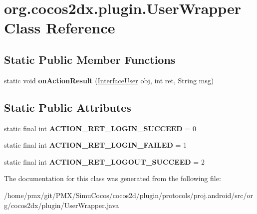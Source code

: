 \hypertarget{classorg_1_1cocos2dx_1_1plugin_1_1UserWrapper}{}\section{org.\+cocos2dx.\+plugin.\+User\+Wrapper Class Reference}
\label{classorg_1_1cocos2dx_1_1plugin_1_1UserWrapper}
\subsection*{Static Public Member Functions}
\begin{DoxyCompactItemize}
\item 
\mbox{\label{classorg_1_1cocos2dx_1_1plugin_1_1UserWrapper_aa4f1804473a90a804eaedb312f89d37d}} 
static void {\bfseries on\+Action\+Result} (\hyperlink{interfaceorg_1_1cocos2dx_1_1plugin_1_1InterfaceUser}{Interface\+User} obj, int ret, String msg)
\end{DoxyCompactItemize}
\subsection*{Static Public Attributes}
\begin{DoxyCompactItemize}
\item 
\mbox{\label{classorg_1_1cocos2dx_1_1plugin_1_1UserWrapper_a5e4d454495c224e5211906a0e9ef5ab5}} 
static final int {\bfseries A\+C\+T\+I\+O\+N\+\_\+\+R\+E\+T\+\_\+\+L\+O\+G\+I\+N\+\_\+\+S\+U\+C\+C\+E\+ED} = 0
\item 
\mbox{\label{classorg_1_1cocos2dx_1_1plugin_1_1UserWrapper_a35bb549275dd3e7a134d9a21541b9fd1}} 
static final int {\bfseries A\+C\+T\+I\+O\+N\+\_\+\+R\+E\+T\+\_\+\+L\+O\+G\+I\+N\+\_\+\+F\+A\+I\+L\+ED} = 1
\item 
\mbox{\label{classorg_1_1cocos2dx_1_1plugin_1_1UserWrapper_a6ead9a95b1121b1a1dce6b14f051862e}} 
static final int {\bfseries A\+C\+T\+I\+O\+N\+\_\+\+R\+E\+T\+\_\+\+L\+O\+G\+O\+U\+T\+\_\+\+S\+U\+C\+C\+E\+ED} = 2
\end{DoxyCompactItemize}


The documentation for this class was generated from the following file\+:\begin{DoxyCompactItemize}
\item 
/home/pmx/git/\+P\+M\+X/\+Simu\+Cocos/cocos2d/plugin/protocols/proj.\+android/src/org/cocos2dx/plugin/User\+Wrapper.\+java\end{DoxyCompactItemize}

